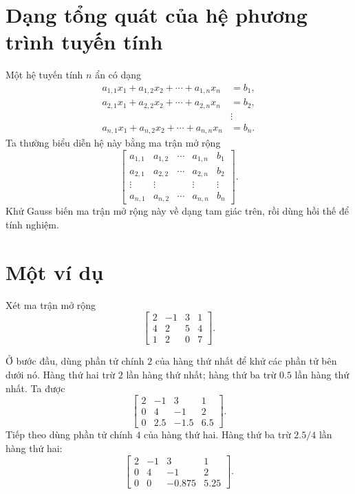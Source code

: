 \documentclass[11pt]{article}
\begin{document}
\section{Dạng tổng quát của hệ phương trình tuyến tính}

Một hệ tuyến tính \(n\) ẩn có dạng
\[
\begin{aligned}
  a_{1,1}x_1+a_{1,2}x_2+\cdots+a_{1,n}x_n&=b_1,\\
  a_{2,1}x_1+a_{2,2}x_2+\cdots+a_{2,n}x_n&=b_2,\\
  &\vdots\\
  a_{n,1}x_1+a_{n,2}x_2+\cdots+a_{n,n}x_n&=b_n.
\end{aligned}
\]
Ta thường biểu diễn hệ này bằng ma trận mở rộng
\[
\left[
\begin{array}{cccc|c}
a_{1,1} & a_{1,2} & \cdots & a_{1,n} & b_1\\
a_{2,1} & a_{2,2} & \cdots & a_{2,n} & b_2\\
\vdots  & \vdots  &        & \vdots  & \vdots\\
a_{n,1} & a_{n,2} & \cdots & a_{n,n} & b_n
\end{array}
\right].
\]
Khử Gauss biến ma trận mở rộng này về dạng tam giác trên, rồi dùng hồi thế để
tính nghiệm.

\section{Một ví dụ}

Xét ma trận mở rộng
\[
\left[
\begin{array}{rrr|r}
2 & -1 & 3 & 1\\
4 & 2 & 5 & 4\\
1 & 2 & 0 & 7
\end{array}
\right].
\]

Ở bước đầu, dùng phần tử chính \(2\) của hàng thứ nhất để khử các phần tử bên
dưới nó. Hàng thứ hai trừ \(2\) lần hàng thứ nhất; hàng thứ ba trừ \(0.5\) lần
hàng thứ nhất. Ta được
\[
\left[
\begin{array}{rrr|r}
2 & -1 & 3 & 1\\
0 & 4 & -1 & 2\\
0 & 2.5 & -1.5 & 6.5
\end{array}
\right].
\]
Tiếp theo dùng phần tử chính \(4\) của hàng thứ hai. Hàng thứ ba trừ
\(2.5/4\) lần hàng thứ hai:
\[
\left[
\begin{array}{rrr|r}
2 & -1 & 3 & 1\\
0 & 4 & -1 & 2\\
0 & 0 & -0.875 & 5.25
\end{array}
\right].
\]
\end{document}
